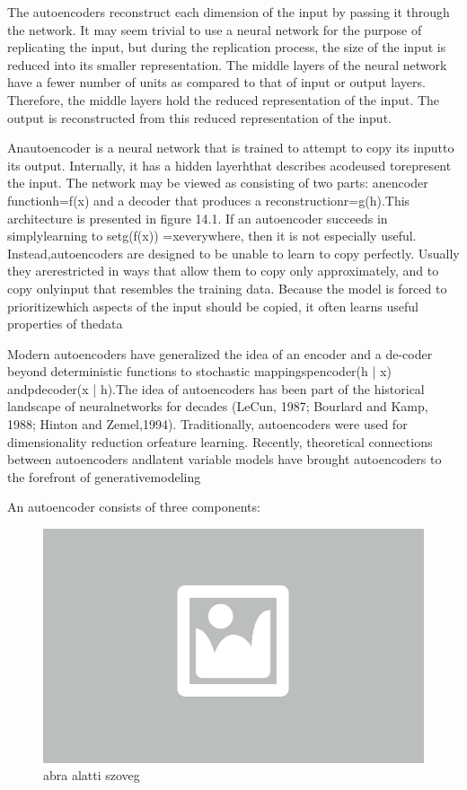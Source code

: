 The autoencoders reconstruct each dimension of the input by passing it through the network. It may seem trivial to use a neural network for the purpose of replicating the input, but during the replication process, the size of the input is reduced into its smaller representation. The middle layers of the neural network have a fewer number of units as compared to that of input or output layers. Therefore, the middle layers hold the reduced representation of the input. The output is reconstructed from this reduced representation of the input.

Anautoencoder is a neural network that is trained to attempt to copy its inputto its output. Internally, it has a hidden layerhthat describes acodeused torepresent the input. The network may be viewed as consisting of two parts: anencoder functionh=f(x) and a decoder that produces a reconstructionr=g(h).This architecture is presented in ﬁgure 14.1. If an autoencoder succeeds in simplylearning to setg(f(x)) =xeverywhere, then it is not especially useful. Instead,autoencoders are designed to be unable to learn to copy perfectly. Usually they arerestricted in ways that allow them to copy only approximately, and to copy onlyinput that resembles the training data. Because the model is forced to prioritizewhich aspects of the input should be copied, it often learns useful properties of thedata

Modern autoencoders have generalized the idea of an encoder and a de-coder beyond deterministic functions to stochastic mappingspencoder(h | x) andpdecoder(x | h).The idea of autoencoders has been part of the historical landscape of neuralnetworks for decades (LeCun, 1987; Bourlard and Kamp, 1988; Hinton and Zemel,1994). Traditionally, autoencoders were used for dimensionality reduction orfeature learning. Recently, theoretical connections between autoencoders andlatent variable models have brought autoencoders to the forefront of generativemodeling

An autoencoder consists of three components:

\begin{figure}[ht]
	\centering
	\includegraphics[width=0.65\columnwidth]{figures/abra.png}
	\caption{abra alatti szoveg}
\end{figure}

